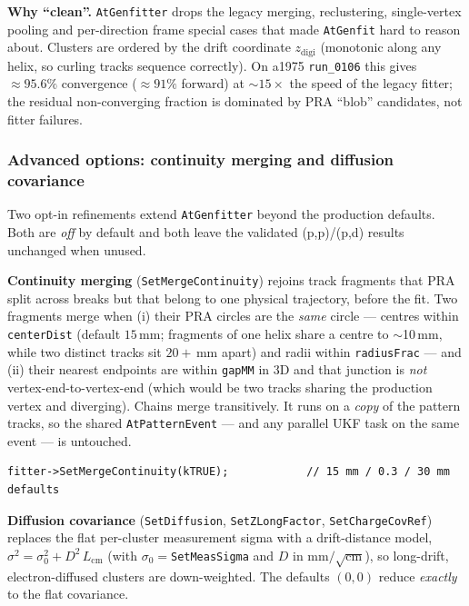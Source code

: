 \documentclass[11pt,a4paper]{article}
\newcommand{\code}[1]{\texttt{\small #1}}
\begin{document}
\begin{notebox}
\textbf{Why ``clean''.} \code{AtGenfitter} drops the legacy merging,
reclustering, single-vertex pooling and per-direction frame special cases that
made \code{AtGenfit} hard to reason about. Clusters are ordered by the drift
coordinate $z_\mathrm{digi}$ (monotonic along any helix, so curling tracks
sequence correctly). On a1975 \code{run\_0106} this gives $\approx 95.6\%$
convergence ($\approx 91\%$ forward) at $\sim 15\times$ the speed of the legacy
fitter; the residual non-converging fraction is dominated by PRA ``blob''
candidates, not fitter failures.
\end{notebox}

\subsubsection*{Advanced options: continuity merging and diffusion covariance}
\label{sec:advgenfit}

Two opt-in refinements extend \code{AtGenfitter} beyond the production defaults.
Both are \emph{off} by default and both leave the validated (p,p)/(p,d) results
unchanged when unused.

\textbf{Continuity merging} (\code{SetMergeContinuity}) rejoins track fragments
that PRA split across breaks but that belong to one physical trajectory, before
the fit. Two fragments merge when (i) their PRA circles are the \emph{same}
circle --- centres within \code{centerDist} (default $15$\,mm; fragments of one
helix share a centre to $\sim$10\,mm, while two distinct tracks sit $20+$\,mm
apart) and radii within \code{radiusFrac} --- and (ii) their nearest endpoints
are within \code{gapMM} in 3D and that junction is \emph{not}
vertex-end-to-vertex-end (which would be two tracks sharing the production vertex
and diverging). Chains merge transitively. It runs on a \emph{copy} of the
pattern tracks, so the shared \code{AtPatternEvent} --- and any parallel UKF task
on the same event --- is untouched.

\begin{lstlisting}
fitter->SetMergeContinuity(kTRUE);            // 15 mm / 0.3 / 30 mm defaults
\end{lstlisting}

\textbf{Diffusion covariance} (\code{SetDiffusion}, \code{SetZLongFactor},
\code{SetChargeCovRef}) replaces the flat per-cluster measurement sigma with a
drift-distance model, $\sigma^2 = \sigma_0^2 + D^2\,L_\mathrm{cm}$ (with
$\sigma_0=$\code{SetMeasSigma} and $D$ in mm$/\sqrt{\mathrm{cm}}$), so
long-drift, electron-diffused clusters are down-weighted. The defaults $(0,0)$
reduce \emph{exactly} to the flat covariance.
\end{document}
